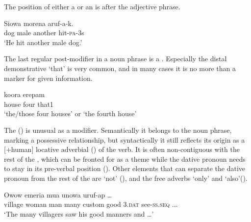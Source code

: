 The position of either a  or an  is after the adjective phrase.

\ea%
\label{ex:x804}
\gll Siowa  morena    aruf-a-k. \\
  dog  male  another  hit-\textsc{pa}-3s    \\
\glt`He hit another male dog.'
\z





The last regular post-modifier in a noun phrase is a . Especially the distal demonstrative  `that' is very common, and in many cases it is no more than a marker for given information.

\ea%
\label{ex:x805}
\gll koora  erepam   \\
 house  four  that1     \\
\glt`the/those four houses' or `the fourth house'
\z





The  () is unusual as a modifier. Semantically it belongs to the noun phrase, marking a possessive relationship, but syntactically it still reflects its origin as a [+human] locative adverbial () of the verb. It is often non-contiguous with the rest of the , which can be fronted for as a theme  while the dative pronoun needs to stay in its pre-verbal position (). Other elements that can separate the dative pronoun from the rest of the  are  `not' (), and the free adverbs  `only' and  `also'(). 

\ea%
\label{ex:x1793}
\gll Owow  emeria  mua  unowa       uruf-ap  {\dots} \\
  village  woman  man  many  custom  good  3.\textsc{dat}  see-\textsc{ss}.\textsc{seq}  ...    \\
\glt`The many villagers saw his good manners and {\dots}'
\z





